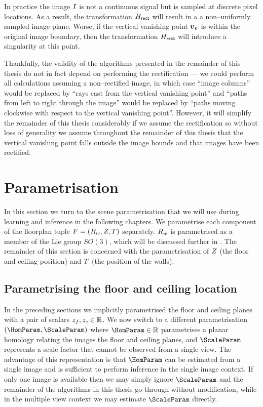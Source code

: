In practice the image $\Image$ is not a continuous signal but is
sampled at discrete pixel locations. As a result, the transformation
$\Rectifier$ will result in a a non--uniformly sampled image
plane. Worse, if the vertical vanishing point $\vvpt$ is within the
original image boundary, then the transformation $\Rectifier$ will
introduce a singularity at this point.

Thankfully, the validity of the algorithms presented in the remainder
of this thesis do not in fact depend on performing the rectification
 --- we could perform all calculations assuming
a non--rectified image, in which case ``image columns'' would be
replaced by ``rays cast from the vertical vanishing point'' and
``paths from left to right through the image'' would be replaced by
``paths moving clockwise with respect to the vertical vanishing
point''. However, it will simplify the remainder of this thesis
considerably if we assume the rectification  so
without loss of generality we assume throughout the remainder of this
thesis that the vertical vanishing point falls outside the image
bounds and that images have been rectified.

\section{Parametrisation}

In this section we turn to the scene parametrisation that we will use
during learning and inference in the following chapters. We
parametrise each component of the floorplan tuple
$\Floorplan=(\SceneR,\Zs,\Polyline)$ separately. $\SceneR$ is
parametrised as a member of the Lie group $SO(3)$, which will be
discussed further in . The remainder of this
section is concerned with the parametrisation of $\Zs$ (the floor and
ceiling position) and $\Polyline$ (the position of the walls).

\subsection{Parametrising the floor and ceiling location}

In the preceding sections we implicitly parametrised the floor and
ceiling planes with a pair of scalars $\zfloor,\zceil\in\Reals$. We
now switch to a different parametrisation $(\HomParam,\ScaleParam)$
where $\HomParam\in\Reals$ parametrises a planar homology relating the images
the floor and ceiling planes, and $\ScaleParam$ represents a scale
factor that cannot be observed from a single view. The advantage of
this representation is that $\HomParam$ can be estimated from a single
image and is sufficient to perform inference in the single image
context. If only one image is available then we may simply ignore
$\ScaleParam$ and the remainder of the algorithms in this thesis go
through without modification, while in the multiple view context we
may estimate $\ScaleParam$ directly.

